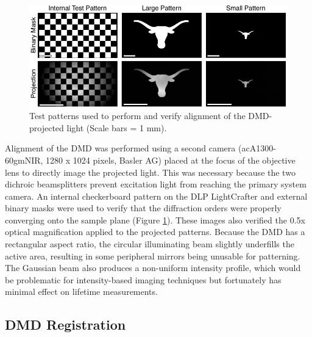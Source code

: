 \begin{figure}
    \includegraphics{figures/chapter_2/dmdalignment.pdf}
    \caption{
        \label{fig:dmdalignment}
        Test patterns used to perform and verify alignment of the DMD-projected light (Scale bars = 1 mm).
    }
\end{figure}

Alignment of the DMD was performed using a second camera (acA1300-60gmNIR, 1280 x 1024 pixels, Basler AG) placed at the focus of the objective lens to directly image the projected light. This was necessary because the two dichroic beamsplitters prevent excitation light from reaching the primary system camera. An internal checkerboard pattern on the DLP LightCrafter and external binary masks were used to verify that the diffraction orders were properly converging onto the sample plane (Figure \ref{fig:dmdalignment}). These images also verified the 0.5x optical magnification applied to the projected patterns. Because the DMD has a rectangular aspect ratio, the circular illuminating beam slightly underfills the active area, resulting in some peripheral mirrors being unusable for patterning. The Gaussian beam also produces a non-uniform intensity profile, which would be problematic for intensity-based imaging techniques but fortunately has minimal effect on lifetime measurements.

\subsection{DMD Registration} \label{ssec:dmd_registration}

